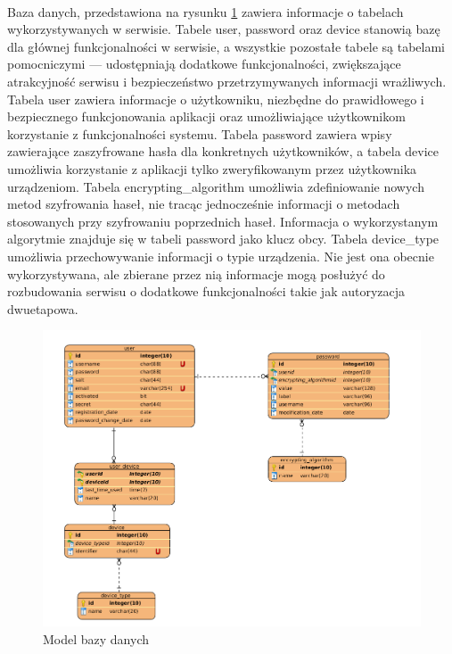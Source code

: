 \documentclass{article}
\begin{document}
    \paragraph{}Baza danych, przedstawiona na rysunku \ref{fig:db} zawiera informacje o tabelach wykorzystywanych w serwisie. Tabele user, password oraz device stanowią bazę dla głównej funkcjonalności w serwisie, a wszystkie pozostałe tabele są tabelami pomocniczymi --- udostępniają dodatkowe funkcjonalności, zwiększające atrakcyjność serwisu i bezpieczeństwo przetrzymywanych informacji wrażliwych. Tabela user zawiera informacje o użytkowniku, niezbędne do prawidłowego i bezpiecznego funkcjonowania aplikacji oraz umożliwiające użytkownikom korzystanie z funkcjonalności systemu. Tabela password zawiera wpisy zawierające zaszyfrowane hasła dla konkretnych użytkowników, a tabela device umożliwia korzystanie z aplikacji tylko zweryfikowanym przez użytkownika urządzeniom. Tabela encrypting\_algorithm umożliwia zdefiniowanie nowych metod szyfrowania haseł, nie tracąc jednocześnie informacji o metodach stosowanych przy szyfrowaniu poprzednich haseł. Informacja o wykorzystanym algorytmie znajduje się w tabeli password jako klucz obcy. Tabela device\_type umożliwia przechowywanie informacji o typie urządzenia. Nie jest ona obecnie wykorzystywana, ale zbierane przez nią informacje mogą posłużyć do rozbudowania serwisu o dodatkowe funkcjonalności takie jak autoryzacja dwuetapowa.

    \begin{figure}[H]
		\centering
		\includegraphics[width=1\linewidth]{assets/db.png}
		\caption[]{Model bazy danych}
		\label{fig:db}
	\end{figure}
\end{document}
